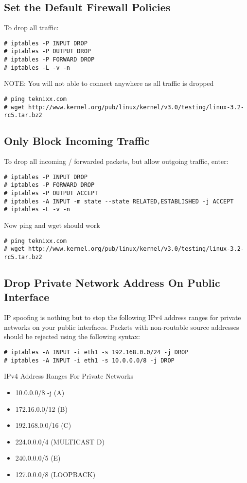 \subsection{Set the Default Firewall Policies}

To drop all traffic:
\begin{verbatim}
# iptables -P INPUT DROP
# iptables -P OUTPUT DROP
# iptables -P FORWARD DROP
# iptables -L -v -n
\end{verbatim}

NOTE: You will not able to connect anywhere as all traffic is dropped
\begin{verbatim}
# ping teknixx.com
# wget http://www.kernel.org/pub/linux/kernel/v3.0/testing/linux-3.2-rc5.tar.bz2
\end{verbatim}

\subsection{Only Block Incoming Traffic}

To drop all incoming / forwarded packets, but allow outgoing traffic, enter:
\begin{verbatim}
# iptables -P INPUT DROP
# iptables -P FORWARD DROP
# iptables -P OUTPUT ACCEPT
# iptables -A INPUT -m state --state RELATED,ESTABLISHED -j ACCEPT
# iptables -L -v -n
\end{verbatim}

Now ping and wget should work
\begin{verbatim}
# ping teknixx.com
# wget http://www.kernel.org/pub/linux/kernel/v3.0/testing/linux-3.2-rc5.tar.bz2
\end{verbatim}

\subsection{Drop Private Network Address On Public Interface}

IP spoofing is nothing but to stop the following IPv4 address ranges
for private networks on your public interfaces. Packets with
non-routable source addresses should be rejected using the following
syntax:
\begin{verbatim}
# iptables -A INPUT -i eth1 -s 192.168.0.0/24 -j DROP
# iptables -A INPUT -i eth1 -s 10.0.0.0/8 -j DROP
\end{verbatim}

IPv4 Address Ranges For Private Networks
\begin{itemize}
\item 10.0.0.0/8 -j (A)
\item 172.16.0.0/12 (B)
\item 192.168.0.0/16 (C)
\item 224.0.0.0/4 (MULTICAST D)
\item 240.0.0.0/5 (E)
\item 127.0.0.0/8 (LOOPBACK)
\end{itemize}

